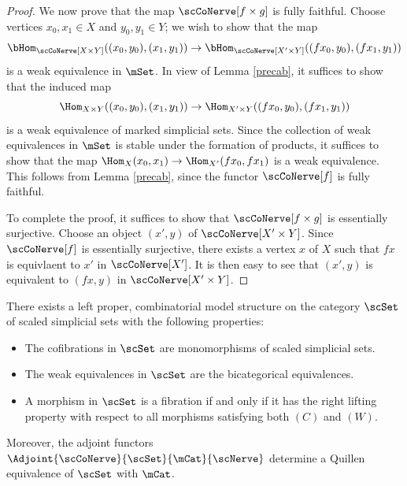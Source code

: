 \begin{proof}
We now prove that the map $\scCoNerve[f \times g]$ is fully faithful. Choose vertices
$x_0, x_1 \in X$ and $y_0, y_1 \in Y$; we wish to show that the map
$$ \bHom_{ \scCoNerve[ X \times Y]}( (x_0, y_0), (x_1, y_1))
\rightarrow \bHom_{ \scCoNerve[ X' \times Y]}( (fx_0, y_0), (fx_1, y_1))$$
is a weak equivalence in $\mSet$. In view of Lemma \ref{precab}, it suffices to show that the induced map
$$ \Hom_{ X \times Y}( (x_0, y_0), (x_1, y_1) ) \rightarrow \Hom_{ X' \times Y}( (fx_0, y_0), (fx_1, y_1))$$
is a weak equivalence of marked simplicial sets. Since the collection of weak equivalences in $\mSet$ is stable under the formation of products, it suffices to show that the map
$\Hom_{ X}(x_0, x_1) \rightarrow \Hom_{X'}(fx_0, fx_1)$ is a weak equivalence. This follows from Lemma \ref{precab}, since the functor $\scCoNerve[f]$ is fully faithful.

To complete the proof, it suffices to show that $\scCoNerve[f \times g]$ is essentially surjective.
Choose an object $(x',y)$ of $\scCoNerve[ X' \times Y]$. Since $\scCoNerve[f]$ is essentially surjective, there exists a vertex $x$ of $X$ such that $fx$ is equivlaent to $x'$ in $\scCoNerve[X']$. It is then easy to see that $(x',y)$ is equivalent to $(fx,y)$ in $\scCoNerve[X' \times Y]$.
\end{proof}

\begin{theorem}\label{slai}
There exists a left proper, combinatorial model structure on the category
$\scSet$ of scaled simplicial sets with the following properties:
\begin{itemize}
\item[$(C)$] The cofibrations in $\scSet$ are monomorphisms of scaled simplicial sets.
\item[$(W)$] The weak equivalences in $\scSet$ are the bicategorical equivalences.
\item[$(F)$] A morphism in $\scSet$ is a fibration if and only if it has the right lifting property with respect to all morphisms satisfying both $(C)$ and $(W)$.
\end{itemize}
Moreover, the adjoint functors $\Adjoint{ \scCoNerve}{\scSet}{\mCat}{\scNerve}$ determine a Quillen equivalence of $\scSet$ with $\mCat$.
\end{theorem}


